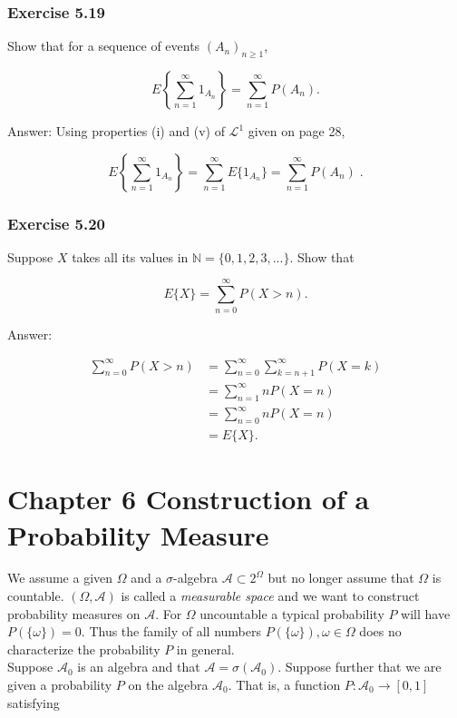 \documentclass{article}
\begin{document}
{\subsubsection*{Exercise 5.19}

Show that for a sequence of events $(A_n)_{n\geq 1}$, 

$$
E\left\lbrace \sum_{n=1}^\infty 1_{A_n} \right\rbrace
= \sum_{n=1}^\infty P(A_n) .
$$

Answer: Using properties (i) and (v) of $\mathcal{L}^1$ given on page 28,

$$
E\left\lbrace \sum_{n=1}^\infty 1_{A_n} \right\rbrace
= \sum_{n=1}^\infty E\{1_{A_n} \}
= \sum_{n=1}^\infty P(A_n) \;.
$$

\subsubsection*{Exercise 5.20}

Suppose $X$ takes all its values in $\mathbb{N} = \{0, 1, 2, 3,...\}$. Show that

$$
E\{X\} = \sum_{n=0}^\infty P(X > n).
$$

Answer:

\begin{align*}
\sum_{n=0}^\infty P(X > n) &= \sum_{n=0}^\infty \sum_{k = n+1}^\infty P(X = k) \\
&= \sum_{n=1}^\infty nP(X = n) \\
&= \sum_{n=0}^\infty nP(X = n) \\
&= E\{X\}.
\end{align*}

\newpage
\section*{Chapter 6 Construction of a Probability Measure}

We assume a given $\Omega$ and a $\sigma$-algebra $\mathcal{A} \subset 2^\Omega$ but no longer assume that $\Omega$ is countable. $(\Omega, \mathcal{A})$ is called a \textit{measurable space} and we want to construct probability measures on $\mathcal{A}$. For $\Omega$ uncountable a typical probability $P$ will have $P(\{\omega\}) = 0$. Thus the family of all numbers $P(\{\omega\}), \omega \in \Omega$ does no characterize the probability $P$ in general. \\

Suppose $\mathcal{A}_0$ is an algebra and that $\mathcal{A} = \sigma(\mathcal{A}_0)$. Suppose further that we are given a probability $P$ on the algebra $\mathcal{A}_0$. That is, a function $P: \mathcal{A}_0 \rightarrow [0,1]$ satisfying

}
\end{document}
